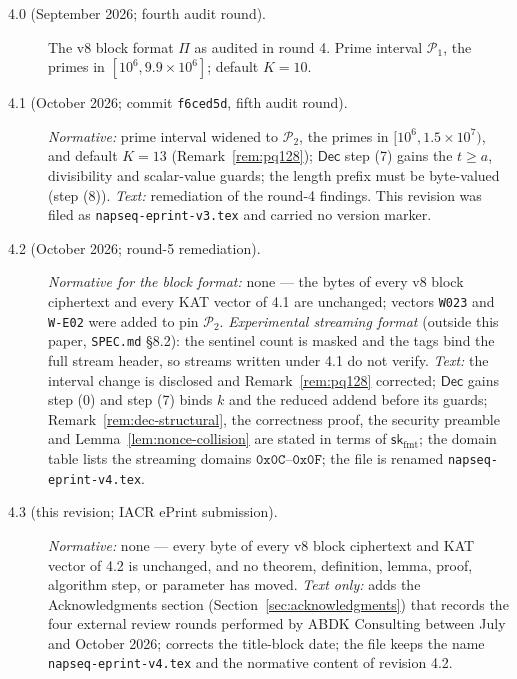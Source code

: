 \documentclass[11pt,a4paper]{article}
\begin{document}
\begin{description}
  \item[4.0 (September 2026; fourth audit round).] The v8 block format
        $\Pi$ as audited in round 4. Prime interval $\mathcal{P}_1$, the
        primes in $[10^6, 9.9\times10^6]$; default $K=10$.
  \item[4.1 (October 2026; commit \texttt{f6ced5d}, fifth audit round).]
        \emph{Normative:} prime interval widened to $\mathcal{P}_2$, the
        primes in $[10^6,1.5\times10^7)$, and default $K=13$
        (Remark~\ref{rem:pq128}); $\mathsf{Dec}$ step (7) gains the
        $t\ge a$, divisibility and scalar-value guards; the length prefix
        must be byte-valued (step (8)). \emph{Text:} remediation of the
        round-4 findings. This revision was filed as
        \texttt{napseq-eprint-v3.tex} and carried no version marker.
  \item[4.2 (October 2026; round-5 remediation).] \emph{Normative for the
        block format:} none — the bytes of every v8 block ciphertext and
        every KAT vector of 4.1 are unchanged; vectors \texttt{W023} and
        \texttt{W-E02} were added to pin $\mathcal{P}_2$.
        \emph{Experimental streaming format} (outside this paper,
        \texttt{SPEC.md} \S 8.2): the sentinel count is masked and the
        tags bind the full stream header, so streams written under 4.1 do
        not verify. \emph{Text:} the interval change is disclosed and
        Remark~\ref{rem:pq128} corrected; $\mathsf{Dec}$ gains step (0) and
        step (7) binds $k$ and the reduced addend before its guards;
        Remark~\ref{rem:dec-structural}, the correctness proof, the
        security preamble and Lemma~\ref{lem:nonce-collision} are stated
        in terms of $\mathsf{sk}_{\mathrm{fmt}}$; the domain table lists the
        streaming domains $\texttt{0x0C}$--$\texttt{0x0F}$; the file is
        renamed \texttt{napseq-eprint-v4.tex}.
  \item[4.3 (this revision; IACR ePrint submission).] \emph{Normative:}
        none — every byte of every v8 block ciphertext and KAT vector of
        4.2 is unchanged, and no theorem, definition, lemma, proof,
        algorithm step, or parameter has moved. \emph{Text only:} adds
        the Acknowledgments section (Section~\ref{sec:acknowledgments})
        that records the four external review rounds performed by ABDK
        Consulting between July and October 2026; corrects the title-block
        date; the file keeps the name \texttt{napseq-eprint-v4.tex} and
        the normative content of revision 4.2.
\end{description}
\end{document}
